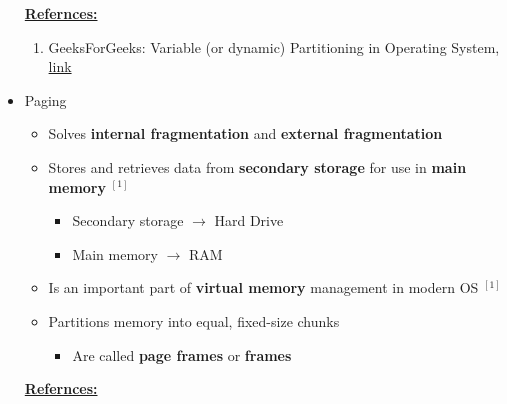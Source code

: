 \documentclass[12pt]{article}
\begin{document}
\begin{itemize}
    \underline{\textbf{Refernces:}}

    \bigskip

    \begin{enumerate}[1)]
        \item GeeksForGeeks: Variable (or dynamic) Partitioning in Operating System, \href{https://www.geeksforgeeks.org/variable-or-dynamic-partitioning-in-operating-system/}{link}
    \end{enumerate}
    \item Paging
    \begin{itemize}
        \item Solves \textbf{internal fragmentation} and \textbf{external fragmentation}
        \item Stores and retrieves data from \textbf{secondary storage} for use
        in \textbf{main memory} $^{[1]}$
        \begin{itemize}
            \item Secondary storage $\to$ Hard Drive
            \item Main memory $\to$ RAM
        \end{itemize}
        \item Is an important part of \textbf{virtual memory} management in modern
        OS $^{[1]}$
        \item Partitions memory into equal, fixed-size chunks
        \begin{itemize}
            \item Are called \textbf{page frames} or \textbf{frames}
        \end{itemize}
    \end{itemize}

    \bigskip

    \underline{\textbf{Refernces:}}

    \bigskip


\end{itemize}
\end{document}
